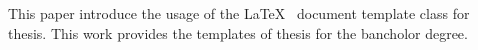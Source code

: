 \begin{abstract}
	
本文简要介绍了本科毕业论文模板的使用方法。



\end{abstract}

\begin{englishabstract}

This paper introduce the usage of the \LaTeX~ document template class for thesis.  This work provides the templates of thesis for the bancholor  degree.


\end{englishabstract}

